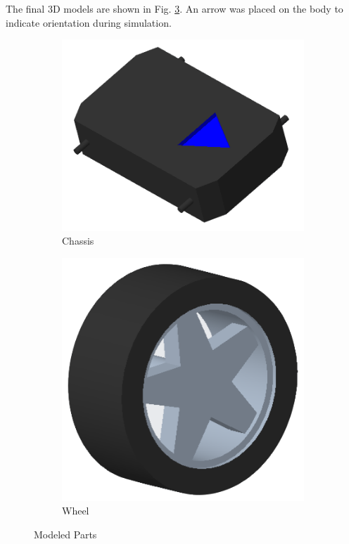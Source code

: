 The final 3D models are shown in Fig. \ref{fig:runtRoverModels}. An arrow was placed on the body to indicate orientation during simulation.

\begin{figure}
    \centering
    \begin{subfigure}[b]{0.6\textwidth}
        \centering
        \includegraphics[width=\textwidth]{figs/img/runtRoverChassis}
        \caption{Chassis}
        \label{fig:runtRoverChassis}
    \end{subfigure}
    \hfill
    \begin{subfigure}[b]{0.3\textwidth}
        \centering
        \includegraphics[width=\textwidth]{figs/img/runtRoverWheel}
        \caption{Wheel}
        \label{fig:runtRoverWheel}
    \end{subfigure}
    \caption{Modeled Parts}
    \label{fig:runtRoverModels}
\end{figure}

